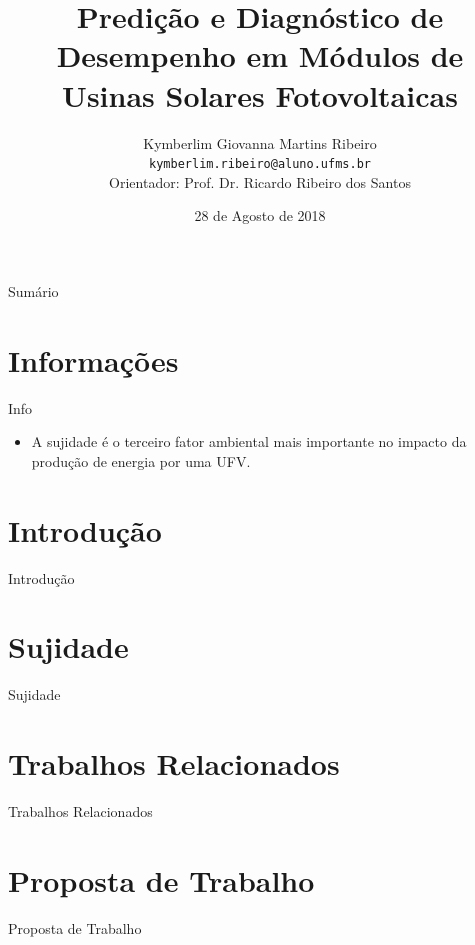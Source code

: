 \documentclass{beamer}
\title[Modelo de Apresentação]{Predição e Diagnóstico de Desempenho em Módulos de Usinas Solares Fotovoltaicas}
\author{Kymberlim Giovanna Martins Ribeiro\\
{\footnotesize \texttt{kymberlim.ribeiro@aluno.ufms.br}}\\{Orientador: Prof. Dr. Ricardo Ribeiro dos Santos}}
\institute{Mestrado Acadêmico em Ciência da Computação\\
Faculdade de Computação - UFMS}
\date{28 de Agosto de 2018}
\begin{document}
\begin{frame}
  \titlepage
\end{frame}


\begin{frame}{Sumário}
  \tableofcontents
\end{frame}

\section{Informações}
\begin{frame}{Info}
    \begin{itemize}
        \item A sujidade é o terceiro fator ambiental mais importante no impacto da produção de energia por uma UFV.
    \end{itemize}
\end{frame}

\section{Introdução}
\begin{frame}{Introdução}
    
\end{frame}

\section{Sujidade}
\begin{frame}{Sujidade}
    
\end{frame}

\section{Trabalhos Relacionados}
\begin{frame}{Trabalhos Relacionados}
    
\end{frame}

\section{Proposta de Trabalho}
\begin{frame}{Proposta de Trabalho}
    
\end{frame}
\end{document}
